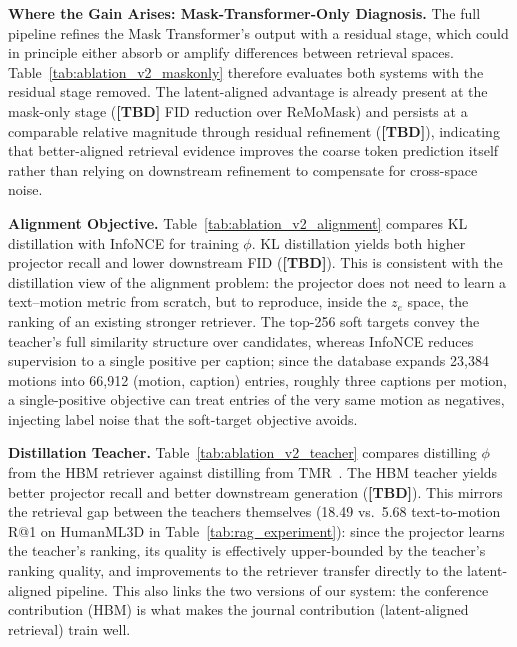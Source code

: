 \documentclass[10pt,journal,compsoc]{IEEEtran}
\newcommand{\myparagraph}[1]{\textbf{#1}\hspace{1.8ex}}
\begin{document}
\noindent \myparagraph{Where the Gain Arises: Mask-Transformer-Only Diagnosis.}
The full pipeline refines the Mask Transformer's output with a residual stage, which could in principle either absorb or amplify differences between retrieval spaces. Table~\ref{tab:ablation_v2_maskonly} therefore evaluates both systems with the residual stage removed. The latent-aligned advantage is already present at the mask-only stage (\textbf{[TBD]} FID reduction over ReMoMask) and persists at a comparable relative magnitude through residual refinement (\textbf{[TBD]}), indicating that better-aligned retrieval evidence improves the coarse token prediction itself rather than relying on downstream refinement to compensate for cross-space noise.

\noindent \myparagraph{Alignment Objective.}
Table~\ref{tab:ablation_v2_alignment} compares KL distillation with InfoNCE for training $\phi$. KL distillation yields both higher projector recall and lower downstream FID (\textbf{[TBD]}). This is consistent with the distillation view of the alignment problem: the projector does not need to learn a text--motion metric from scratch, but to reproduce, inside the $z_e$ space, the ranking of an existing stronger retriever. The top-256 soft targets convey the teacher's full similarity structure over candidates, whereas InfoNCE reduces supervision to a single positive per caption; since the database expands 23,384 motions into 66,912 (motion, caption) entries, roughly three captions per motion, a single-positive objective can treat entries of the very same motion as negatives, injecting label noise that the soft-target objective avoids.

\noindent \myparagraph{Distillation Teacher.}
Table~\ref{tab:ablation_v2_teacher} compares distilling $\phi$ from the HBM retriever against distilling from TMR~\cite{tmr}. The HBM teacher yields better projector recall and better downstream generation (\textbf{[TBD]}). This mirrors the retrieval gap between the teachers themselves (18.49 vs.\ 5.68 text-to-motion R@1 on HumanML3D in Table~\ref{tab:rag_experiment}): since the projector learns the teacher's ranking, its quality is effectively upper-bounded by the teacher's ranking quality, and improvements to the retriever transfer directly to the latent-aligned pipeline. This also links the two versions of our system: the conference contribution (HBM) is what makes the journal contribution (latent-aligned retrieval) train well.
\end{document}

